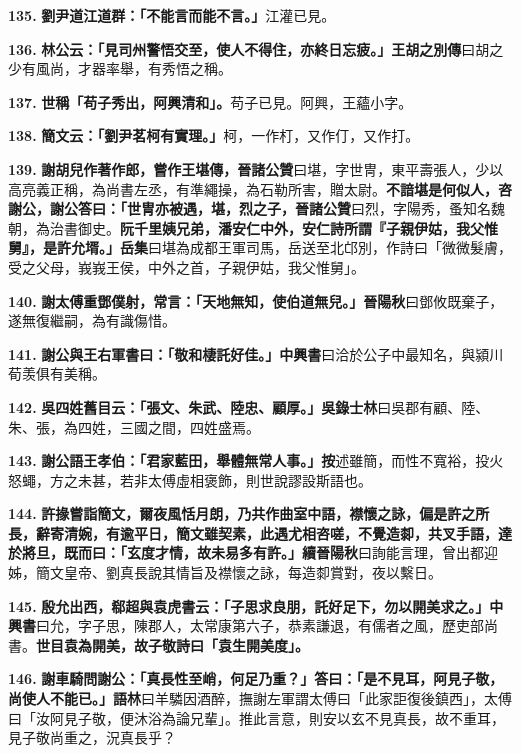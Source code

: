 \textbf{135.} \textbf{劉尹道江道群：「不能言而能不言。」}{\footnotesize 江灌已見。}

\textbf{136.} \textbf{林公云：「見司州警悟交至，使人不得住，亦終日忘疲。」}{\footnotesize \textbf{王胡之別傳}曰胡之少有風尚，才器率舉，有秀悟之稱。}

\textbf{137.} \textbf{世稱「苟子秀出，阿興清和」。}{\footnotesize 苟子已見。阿興，王蘊小字。}

\textbf{138.} \textbf{簡文云：「劉尹茗柯有實理。」}{\footnotesize 柯，一作朾，又作仃，又作打。}

\textbf{139.} \textbf{謝胡兒作著作郎，嘗作王堪傳，}{\footnotesize \textbf{晉諸公贊}曰堪，字世冑，東平壽張人，少以高亮義正稱，為尚書左丞，有準繩操，為石勒所害，贈太尉。}\textbf{不諳堪是何似人，咨謝公，謝公答曰：「世冑亦被遇，堪，烈之子，}{\footnotesize \textbf{晉諸公贊}曰烈，字陽秀，蚤知名魏朝，為治書御史。}\textbf{阮千里姨兄弟，潘安仁中外，安仁詩所謂『子親伊姑，我父惟舅』，是許允壻。」}{\footnotesize \textbf{岳集}曰堪為成都王軍司馬，岳送至北邙別，作詩曰「微微髮膚，受之父母，峩峩王侯，中外之首，子親伊姑，我父惟舅」。}

\textbf{140.} \textbf{謝太傅重鄧僕射，常言：「天地無知，使伯道無兒。」}{\footnotesize \textbf{晉陽秋}曰鄧攸既棄子，遂無復繼嗣，為有識傷惜。}

\textbf{141.} \textbf{謝公與王右軍書曰：「敬和棲託好佳。」}{\footnotesize \textbf{中興書}曰洽於公子中最知名，與潁川荀羡俱有美稱。}

\textbf{142.} \textbf{吳四姓舊目云：「張文、朱武、陸忠、顧厚。」}{\footnotesize \textbf{吳錄士林}曰吳郡有顧、陸、朱、張，為四姓，三國之間，四姓盛焉。}

\textbf{143.} \textbf{謝公語王孝伯：「君家藍田，舉體無常人事。」}{\footnotesize \textbf{按}述雖簡，而性不寬裕，投火怒蠅，方之未甚，若非太傅虛相褒飾，則世說謬設斯語也。}

\textbf{144.} \textbf{許掾嘗詣簡文，爾夜風恬月朗，乃共作曲室中語，襟懷之詠，偏是許之所長，辭寄清婉，有逾平日，簡文雖契素，此遇尤相咨嗟，不覺造厀，共叉手語，達於將旦，既而曰：「玄度才情，故未易多有許。」}{\footnotesize \textbf{續晉陽秋}曰詢能言理，曾出都迎姊，簡文皇帝、劉真長說其情旨及襟懷之詠，每造厀賞對，夜以繫日。}

\textbf{145.} \textbf{殷允出西，郗超與袁虎書云：「子思求良朋，託好足下，勿以開美求之。」}{\footnotesize \textbf{中興書}曰允，字子思，陳郡人，太常康第六子，恭素謙退，有儒者之風，歷吏部尚書。}\textbf{世目袁為開美，故子敬詩曰「袁生開美度」。}

\textbf{146.} \textbf{謝車騎問謝公：「真長性至峭，何足乃重？」答曰：「是不見耳，阿見子敬，尚使人不能已。」}{\footnotesize \textbf{語林}曰羊驎因酒醉，撫謝左軍謂太傅曰「此家詎復後鎮西」，太傅曰「汝阿見子敬，便沐浴為論兄輩」。推此言意，則安以玄不見真長，故不重耳，見子敬尚重之，況真長乎？}

